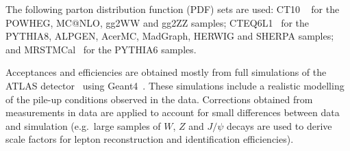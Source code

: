 \documentclass[final,3p,times,twocolumn]{elsarticle}
\begin{document}
The following parton distribution function (PDF) sets are used: CT10 ~\cite{Lai:2010vv}
for the POWHEG, MC@NLO, gg2WW and gg2ZZ samples;
CTEQ6L1~\cite{cteq6} for the PYTHIA8, ALPGEN, AcerMC, MadGraph, HERWIG and SHERPA samples; and
MRSTMCal~\cite{mrst} for the PYTHIA6 samples.

Acceptances and efficiencies are obtained mostly from full simulations of
the ATLAS detector~\cite{atlassim} using {\sc Geant4}~\cite{GEANT4}. These simulations
include a realistic modelling of the pile-up conditions observed in the
data. Corrections obtained from measurements in data are
applied to account for small differences between data and simulation (e.g.\
large samples of $W$, $Z$ and $J/\psi$ decays are used to derive scale
factors for lepton 
reconstruction and identification efficiencies).

\renewcommand{\labelitemi}{$-$}
\newcommand\htollllp{$H\to ZZ^{(*)}\to 4\ell$}
\newcommand\htollllbrief{$H\to ZZ^{(*)}\to 4\ell$}
\newcommand\progname[1]{{\sc #1}}
\newcommand\pval{\ensuremath{p_0}}
\def\brocket#1{\left\langle #1 \right\rangle}
\def\Figref#1{Figure~\ref{#1}} 
\def\figref#1{Fig.~\ref{#1}}   
\def\secref#1{Section~\ref{#1}}
\newcommand{\tabscript}[3]{%
  \setlength{\fboxrule}{0pt}%
  \fbox{\ensuremath{#1^{#2}_{#3}}}%
}
\newcommand\candtwelvemu{22~}
\newcommand\candtwelveemu{19~}
\newcommand\candtwelvemue{14~}
\newcommand\candtwelvee{14~}
\newcommand\candtwelvemix{33~}
\newcommand\candtwelvetotal{79~}
\newcommand\bkgtwelveexp{$XX\pm X$~}
\newcommand\candmu{33~}
\newcommand\candmix{32~}
\newcommand\cande{21~}
\newcommand\candtotal{86~}
\newcommand\candmuexp{22.4~$\pm$~X.X~}
\newcommand\candmixexp{33.7~$\pm$~X.X~}
\newcommand\candeexp{15.3~$\pm$~X.X~}
\newcommand\bkgexp{71.2~$\pm$~X.X~}
\newcommand\lumia{\ensuremath{4.8~\ifb}}
\newcommand\lumiFourMuona{\ensuremath{4.8~\ifb}}
\newcommand\lumiFourElectrona{\ensuremath{4.9~\ifb}}
\newcommand\lumiTwoMuonTwoElectrona{\ensuremath{4.8~\ifb}}
\newcommand\lumib{\ensuremath{5.8~\ifb}}
\newcommand\lumiFourMuonb{\ensuremath{5.8~\ifb}}
\newcommand\lumiFourElectronb{\ensuremath{5.9~\ifb}}
\newcommand\lumiTwoMuonTwoElectronb{\ensuremath{5.8~\ifb}}
\newcommand\sensitivityExpected{0.XX}
\newcommand\sensitivityObserved{0.XX}
\newcommand\sensitivityMass{\ensuremath{200\:\gev}}

\newcommand\pvaluelowexp{10.6\%}
\newcommand\sigmalowexp{\ensuremath{1.3}}
\newcommand\pvaluelow{1.6\%}
\newcommand\sigmalow{\ensuremath{2.1}}
\newcommand\pvaluelowm{\ensuremath{125\gev}}
\end{document}
